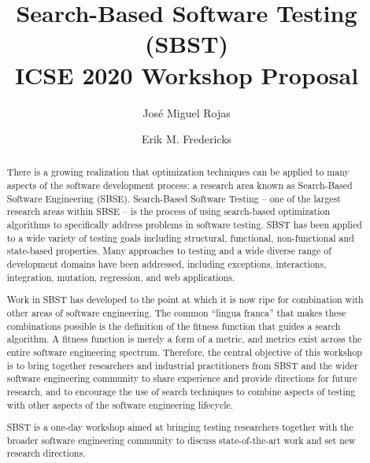 \documentclass[sigconf,review]{acmart}
\begin{document}
\title{Search-Based Software Testing (SBST) \\ ICSE 2020 Workshop Proposal}


\author{Jos\'e Miguel Rojas}

\author{Erik M. Fredericks}

\begin{abstract}
  There is a growing realization that optimization techniques can be
  applied to many aspects of the software development process: a
  research area known as Search-Based Software Engineering
  (SBSE). Search-Based Software Testing -- one of the largest research
  areas within SBSE -- is the process of using search-based
  optimization algorithms to specifically address problems in software
  testing. SBST has been applied to a wide variety of testing goals
  including structural, functional, non-functional and state-based
  properties. Many approaches to testing and a wide diverse range of
  development domains have been addressed, including exceptions,
  interactions, integration, mutation, regression, and web
  applications.

  Work in SBST has developed to the point at which it is now ripe for
  combination with other areas of software engineering. The common
  ``lingua franca'' that makes these combinations possible is the
  definition of the fitness function that guides a search algorithm. A
  fitness function is merely a form of a metric, and metrics exist
  across the entire software engineering spectrum. Therefore, the
  central objective of this workshop is to bring together researchers
  and industrial practitioners from SBST and the wider software
  engineering community to share experience and provide directions for
  future research, and to encourage the use of search techniques to
  combine aspects of testing with other aspects of the software
  engineering lifecycle.

  SBST is a one-day workshop aimed at bringing testing researchers
  together with the broader software engineering community to discuss
  state-of-the-art work and set new research directions.
\end{abstract}

\end{document}
